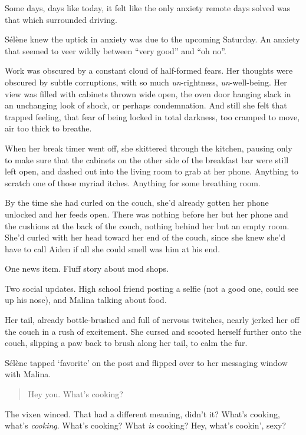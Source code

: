 Some days, days like today, it felt like the only anxiety remote days solved was that which surrounded driving.

Sélène knew the uptick in anxiety was due to the upcoming Saturday. An anxiety that seemed to veer wildly between ``very good'' and ``oh no''.

Work was obscured by a constant cloud of half-formed fears. Her thoughts were obscured by subtle corruptions, with so much \emph{un}-rightness, \emph{un}-well-being. Her view was filled with cabinets thrown wide open, the oven door hanging slack in an unchanging look of shock, or perhaps condemnation. And still she felt that trapped feeling, that fear of being locked in total darkness, too cramped to move, air too thick to breathe.

When her break timer went off, she skittered through the kitchen, pausing only to make sure that the cabinets on the other side of the breakfast bar were still left open, and dashed out into the living room to grab at her phone. Anything to scratch one of those myriad itches. Anything for some breathing room.

By the time she had curled on the couch, she'd already gotten her phone unlocked and her feeds open. There was nothing before her but her phone and the cushions at the back of the couch, nothing behind her but an empty room. She'd curled with her head toward her end of the couch, since she knew she'd have to call Aiden if all she could smell was him at his end.

One news item. Fluff story about mod shops.

Two social updates. High school friend posting a selfie (not a good one, could see up his nose), and Malina talking about food.

Her tail, already bottle-brushed and full of nervous twitches, nearly jerked her off the couch in a rush of excitement. She cursed and scooted herself further onto the couch, slipping a paw back to brush along her tail, to calm the fur.

Sélène tapped `favorite' on the post and flipped over to her messaging window with Malina.

\begin{quote}
Hey you. What's cooking?
\end{quote}

The vixen winced. That had a different meaning, didn't it? What's cooking, what's \emph{cooking}. What's cooking? What \emph{is} cooking? Hey, what's cookin', sexy?

